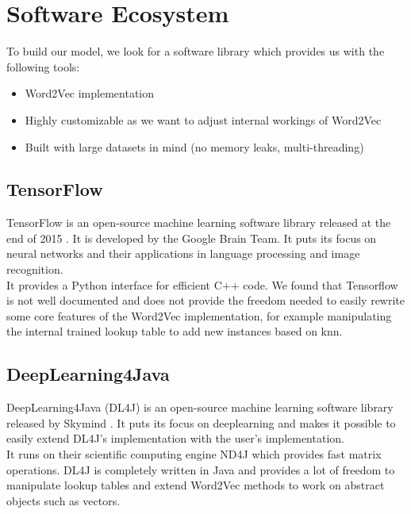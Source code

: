 \section{Software Ecosystem}

To build our model, we look for a software library which provides us with the following tools:

\begin{itemize}

\item Word2Vec implementation
\item Highly customizable as we want to adjust internal workings of Word2Vec
\item Built with large datasets in mind (no memory leaks, multi-threading)

\end{itemize}

\subsection{TensorFlow}

TensorFlow is an open-source machine learning software library released at the end of 2015 \cite{tensorflow:article}. It is developed by the Google Brain Team. It puts its focus on neural networks and their applications in language processing and image recognition. \\
It provides a Python interface for efficient C++ code. We found that Tensorflow is not well documented and does not provide the freedom needed to easily rewrite some core features of the Word2Vec implementation, for example manipulating the internal trained lookup table to add new instances based on knn.


\subsection{DeepLearning4Java}

DeepLearning4Java (DL4J) is an open-source machine learning software library released by Skymind \cite{dl4j:article}. It puts its focus on deeplearning and makes it possible to easily extend DL4J's implementation with the user's implementation. \\
It runs on their scientific computing engine ND4J which provides fast matrix operations. DL4J is completely written in Java and provides a lot of freedom to manipulate lookup tables and extend Word2Vec methods to work on abstract objects such as vectors.


